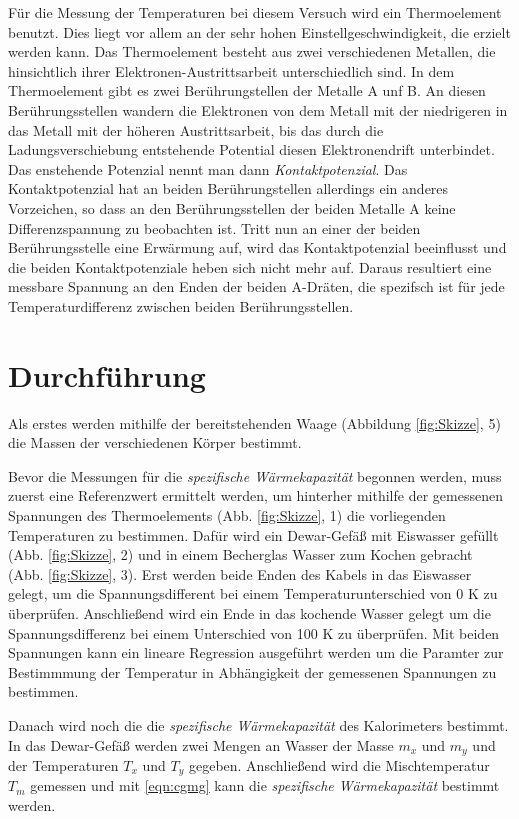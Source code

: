 Für die Messung der Temperaturen bei diesem Versuch wird ein Thermoelement benutzt.
Dies liegt vor allem an der sehr hohen Einstellgeschwindigkeit, die erzielt werden
kann. Das Thermoelement besteht aus zwei verschiedenen Metallen, die hinsichtlich
ihrer Elektronen-Austrittsarbeit unterschiedlich sind. In dem Thermoelement gibt
es zwei Berührungstellen der Metalle A unf B. An diesen Berührungsstellen
wandern die Elektronen von dem Metall mit der niedrigeren in das Metall mit der
höheren Austrittsarbeit, bis das durch die Ladungsverschiebung entstehende Potential
diesen Elektronendrift unterbindet. Das enstehende Potenzial nennt man dann
\emph{Kontaktpotenzial}. Das Kontaktpotenzial hat an beiden Berührungstellen
allerdings ein anderes Vorzeichen, so dass an den Berührungsstellen der beiden
Metalle A keine Differenzspannung zu beobachten ist. Tritt nun an einer der beiden
Berührungsstelle eine Erwärmung auf, wird das Kontaktpotenzial beeinflusst und
die beiden Kontaktpotenziale heben sich nicht mehr auf. Daraus resultiert eine
messbare Spannung an den Enden der beiden A-Dräten, die spezifsch ist für jede
Temperaturdifferenz zwischen beiden Berührungsstellen.

\section{Durchführung}

Als erstes werden mithilfe der bereitstehenden Waage (Abbildung \ref{fig:Skizze}, 5)
die Massen der verschiedenen Körper bestimmt.

Bevor die Messungen für die \emph{spezifische Wärmekapazität} begonnen werden,
muss zuerst eine Referenzwert ermittelt werden, um hinterher mithilfe der gemessenen
Spannungen des Thermoelements (Abb. \ref{fig:Skizze}, 1) die vorliegenden Temperaturen zu bestimmen.
Dafür wird ein Dewar-Gefäß mit Eiswasser gefüllt (Abb. \ref{fig:Skizze}, 2) und in einem Becherglas
Wasser zum Kochen gebracht (Abb. \ref{fig:Skizze}, 3). Erst werden
beide Enden des Kabels in das Eiswasser gelegt, um die Spannungsdifferent bei
einem Temperaturunterschied von 0 K zu überprüfen. Anschließend wird ein Ende in
das kochende Wasser gelegt um die Spannungsdifferenz bei einem Unterschied von
100 K zu überprüfen. Mit beiden Spannungen kann ein lineare Regression ausgeführt
werden um die Paramter zur Bestimmmung der Temperatur in Abhängigkeit der
gemessenen Spannungen zu bestimmen.

Danach wird noch die die \emph{spezifische Wärmekapazität} des Kalorimeters bestimmt.
In das Dewar-Gefäß werden zwei Mengen an Wasser der Masse $m_x$ und $m_y$ und der
Temperaturen $T_x$ und $T_y$ gegeben. Anschließend wird die Mischtemperatur
$T_m$ gemessen und mit \eqref{eqn:cgmg} kann die \emph{spezifische Wärmekapazität}
bestimmt werden.

